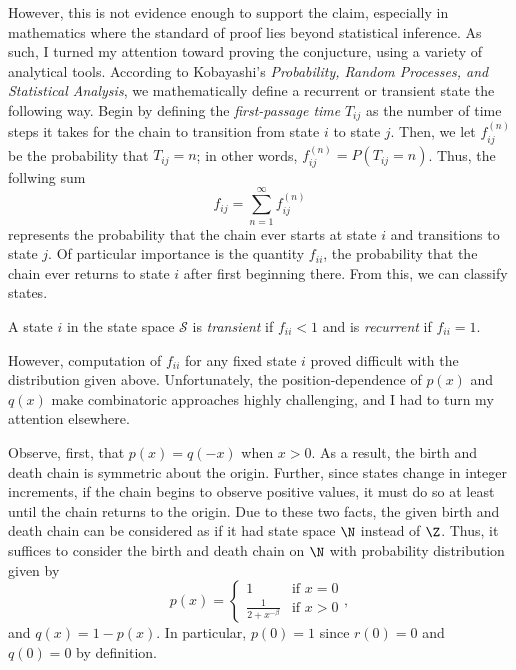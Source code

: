 However, this is not evidence enough to support the claim, especially in mathematics where the standard
of proof lies beyond statistical inference. As such, I turned my attention toward proving the
conjucture, using a variety of analytical tools. According to Kobayashi's \emph{Probability, Random
Processes, and Statistical Analysis}, we mathematically define a recurrent or transient state the
following way. Begin by defining the \emph{first-passage time} $T_{ij}$ as the number of time steps it
takes for the chain to transition from state $i$ to state $j$. Then, we let $f_{ij}^{(n)}$ be the
probability that $T_{ij} = n$; in other words, $f_{ij}^{(n)} = P(T_{ij} = n)$. Thus, the follwing sum
\[
    f_{ij} = \sum_{n=1}^{\infty} f_{ij}^{(n)}  
\]
represents the probability that the chain ever starts at state $i$ and transitions to state $j$. Of
particular importance is the quantity $f_{ii}$, the probability that the chain ever returns to state $i$
after first beginning there. From this, we can classify states.
\begin{definition}
    A state $i$ in the state space $\mathcal{S}$ is \emph{transient} if $f_{ii} < 1$ and is
    \emph{recurrent} if $f_{ii} = 1$.
\end{definition}
However, computation of $f_{ii}$ for any fixed state $i$ proved difficult with the distribution given
above.  Unfortunately, the position-dependence of $p(x)$ and $q(x)$ make combinatoric approaches highly
challenging, and I had to turn my attention elsewhere.

Observe, first, that $p(x) = q(-x)$ when $x > 0$. As a result, the birth and death chain is symmetric
about the origin. Further, since states change in integer increments, if the chain begins to observe
positive values, it must do so at least until the chain returns to the origin. Due to these two facts,
the given birth and death chain can be considered as if it had state space $\N$ instead of $\Z$. Thus,
it suffices to consider the birth and death chain on $\N$ with probability distribution given by
\[
    p(x) = \begin{cases}
        1 & \text{if } x = 0 \\
        \frac{1}{2+x^{-\beta}} & \text{if } x > 0
    \end{cases},
\]
and $q(x) = 1 - p(x)$. In particular, $p(0) = 1$ since $r(0) = 0$ and $q(0) = 0$ by definition.

